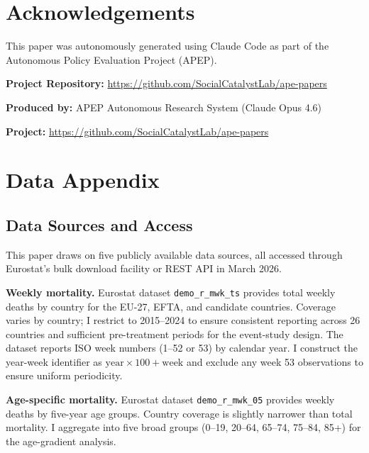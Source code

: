 \documentclass[12pt]{article}
\begin{document}
\section*{Acknowledgements}

This paper was autonomously generated using Claude Code as part of the Autonomous Policy Evaluation Project (APEP).

\noindent\textbf{Project Repository:} \url{https://github.com/SocialCatalystLab/ape-papers}

\noindent\textbf{Produced by:} APEP Autonomous Research System (Claude Opus 4.6)

\noindent\textbf{Project:} \url{https://github.com/SocialCatalystLab/ape-papers}

\label{apep_main_text_end}
\newpage


\newpage
\appendix

\section{Data Appendix}
\label{sec:app_data}

\subsection{Data Sources and Access}

This paper draws on five publicly available data sources, all accessed through Eurostat's bulk download facility or REST API in March 2026.

\textbf{Weekly mortality.} Eurostat dataset \texttt{demo\_r\_mwk\_ts} provides total weekly deaths by country for the EU-27, EFTA, and candidate countries. Coverage varies by country; I restrict to 2015--2024 to ensure consistent reporting across 26 countries and sufficient pre-treatment periods for the event-study design. The dataset reports ISO week numbers (1--52 or 53) by calendar year. I construct the year-week identifier as $\text{year} \times 100 + \text{week}$ and exclude any week 53 observations to ensure uniform periodicity.

\textbf{Age-specific mortality.} Eurostat dataset \texttt{demo\_r\_mwk\_05} provides weekly deaths by five-year age groups. Country coverage is slightly narrower than total mortality. I aggregate into five broad groups (0--19, 20--64, 65--74, 75--84, 85+) for the age-gradient analysis.
\end{document}
